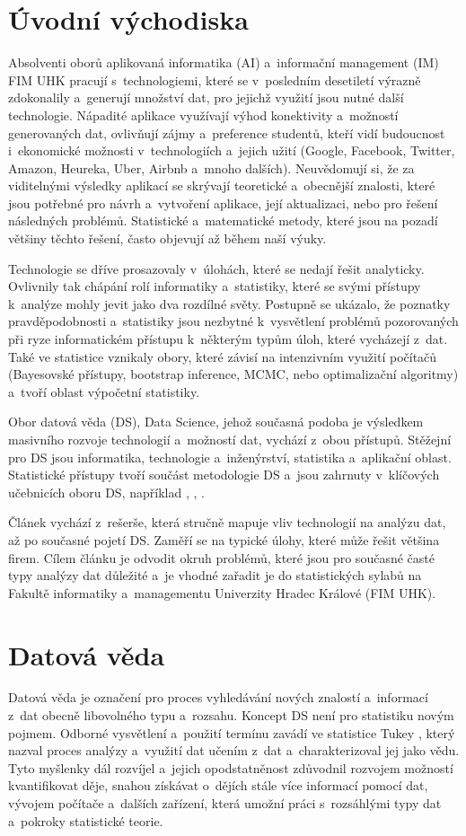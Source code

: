 \section{Úvodní východiska}\label{sec01}
Absolventi oborů aplikovaná informatika (AI) a~informační management (IM) FIM UHK pracují s~technologiemi, které se v~posledním desetiletí výrazně zdokonalily a~generují množství dat, pro jejichž využití jsou nutné další technologie. Nápadité aplikace využívají výhod konektivity a~možností generovaných dat, ovlivňují zájmy a~preference studentů, kteří vidí budoucnost i~ekonomické možnosti v~technologiích a~jejich užití (Google, Facebook, Twitter, Amazon, Heureka, Uber, Airbnb a~mnoho dalších). Neuvědomují si, že za viditelnými výsledky aplikací se skrývají teoretické a~obecnější znalosti, které jsou potřebné pro návrh a~vytvoření aplikace, její aktualizaci, nebo pro řešení následných problémů. Statistické a~matematické metody, které jsou na pozadí většiny těchto řešení, často objevují až během naší výuky.

Technologie se dříve prosazovaly v~úlohách, které se nedají řešit analyticky. Ovlivnily tak chápání rolí informatiky a~statistiky, které se svými přístupy k~analýze mohly jevit jako dva rozdílné světy. Postupně se ukázalo, že poznatky pravděpodobnosti a~statistiky jsou nezbytné k~vysvětlení problémů pozorovaných při ryze informatickém přístupu k~některým typům úloh, které vycházejí z~dat. Také ve statistice vznikaly obory, které závisí na  intenzivním využití počítačů (Bayesovské přístupy, bootstrap inference, MCMC, nebo optimalizační algoritmy) a~tvoří oblast výpočetní statistiky. 

Obor datová věda (DS), Data Science, jehož současná podoba je výsledkem masivního rozvoje technologií a~možností dat, vychází z~obou přístupů. Stěžejní pro DS jsou informatika, technologie a~inženýrství, statistika a~aplikační oblast. Statistické přístupy tvoří součást metodologie DS a~jsou zahrnuty v~klíčových učebnicích oboru DS, například \cite{blu}, \cite{das}, \cite{les}.

Článek vychází z~rešerše, která stručně mapuje vliv technologií na analýzu dat, až po současné pojetí DS. Zaměří se na typické úlohy, které může řešit většina firem. Cílem článku je odvodit okruh problémů, které jsou pro současné časté typy analýzy dat důležité a~je vhodné zařadit je do statistických sylabů na Fakultě informatiky a~managementu Univerzity Hradec Králové (FIM UHK). 

\section{Datová věda}
Datová věda je označení pro proces vyhledávání nových znalostí a~informací z~dat obecně libovolného typu a~rozsahu. Koncept DS není pro statistiku novým pojmem. Odborné vysvětlení a~použití termínu  zavádí ve statistice Tukey \cite{tuk}, který nazval proces analýzy a~využití dat učením z~dat a~charakterizoval jej jako vědu. Tyto myšlenky dál rozvíjel \cite{tuk77} a~jejich opodstatněnost zdůvodnil rozvojem možností kvantifikovat děje, snahou získávat o~dějích stále více informací pomocí dat, vývojem počítače a~dalších zařízení, která umožní práci s~rozsáhlými typy dat a~pokroky statistické teorie. 

